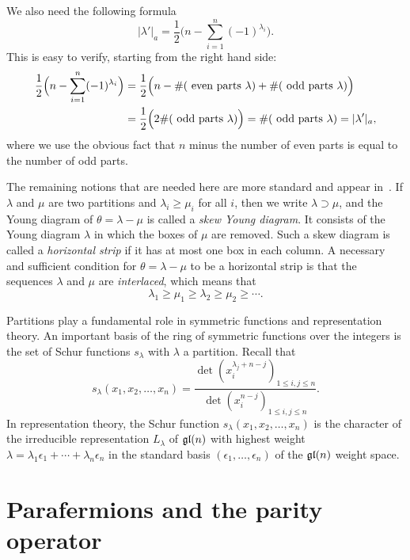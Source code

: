 \documentclass{SciPost}
\begin{document}
We also need the following formula
\begin{equation}
|\lambda'|_a= \frac12 \Big(n-\sum_{i=1}^n (-1)^{\lambda_{i}}\Big).
\label{26}
\end{equation}
This is easy to verify, starting from the right hand side:
\begin{align*}
\frac12\Big(n-\sum_{i=1}^n (-1)^{\lambda_{i}}\Big)&=
\frac12\Big(n-\#(\hbox{ even parts }\lambda) + \#(\hbox{ odd parts }\lambda)\Big) \\
&=
\frac12\Big(2\#(\hbox{ odd parts }\lambda)\Big) = \#(\hbox{ odd parts }\lambda) = |\lambda'|_a,
\end{align*}
where we use the obvious fact that $n$ minus the number of even parts is equal to the number of odd parts.

The remaining notions that are needed here are more standard and appear in~\cite{Macdonald}.
If $\lambda$ and $\mu$ are two partitions and $\lambda_i \geq \mu_i$ for all $i$, then we write $\lambda\supset\mu$, 
and the Young diagram of $\theta=\lambda-\mu$ is called a {\em skew Young diagram}.
It consists of the Young diagram $\lambda$ in which the boxes of $\mu$ are removed.
Such a skew diagram is called a {\em horizontal strip} if it has at most one box in each column.
A necessary and sufficient condition for $\theta=\lambda-\mu$ to be a horizontal strip is that the sequences $\lambda$ and $\mu$ are {\em interlaced}, which means that
\[
\lambda_1\geq\mu_1\geq\lambda_2\geq\mu_2\geq\cdots.
\]

Partitions play a fundamental role in symmetric functions and representation theory. 
An important basis of the ring of symmetric functions over the integers is the set of Schur functions $s_\lambda$ with $\lambda$ a partition.
Recall that
\begin{equation}
s_\lambda(x_1,x_2,\ldots,x_n)= \frac{\det(x_i^{\lambda_j+n-j})_{1\leq i,j\leq n}}{\det(x_i^{n-j})_{1\leq i,j\leq n}}.
\end{equation}
In representation theory, the Schur function $s_\lambda(x_1,x_2,\ldots,x_n)$ is the character of the irreducible representation $L_\lambda$ of $\mathfrak{gl}(n)$ with highest weight $\lambda=\lambda_1\epsilon_1+\cdots +\lambda_n\epsilon_n$ in the standard basis $(\epsilon_1,\ldots,\epsilon_n)$ of the $\mathfrak{gl}(n)$ weight space.

\setcounter{equation}{0}
\section{Parafermions and the parity operator}
\label{sec3}
\end{document}
